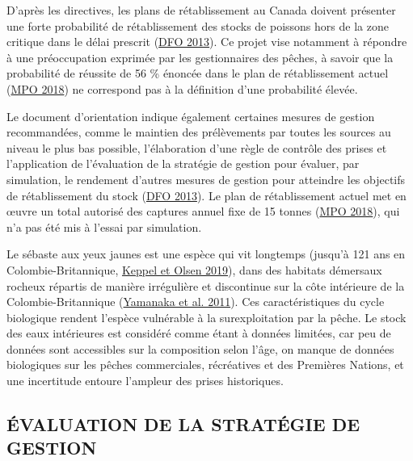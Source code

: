 \documentclass[french,11pt]{book}
\begin{document}
D'après les directives, les plans de rétablissement au Canada doivent présenter une forte probabilité de rétablissement des stocks de poissons hors de la zone critique dans le délai prescrit (\protect\hyperlink{ref-dfo2013}{DFO 2013}). Ce projet vise notamment à répondre à une préoccupation exprimée par les gestionnaires des pêches, à savoir que la probabilité de réussite de 56 \% énoncée dans le plan de rétablissement actuel (\protect\hyperlink{ref-ifmp2018}{MPO 2018}) ne correspond pas à la définition d'une probabilité élevée.

Le document d'orientation indique également certaines mesures de gestion recommandées, comme le maintien des prélèvements par toutes les sources au niveau le plus bas possible, l'élaboration d'une règle de contrôle des prises et l'application de l'évaluation de la stratégie de gestion pour évaluer, par simulation, le rendement d'autres mesures de gestion pour atteindre les objectifs de rétablissement du stock (\protect\hyperlink{ref-dfo2013}{DFO 2013}). Le plan de rétablissement actuel met en œuvre un total autorisé des captures annuel fixe de 15 tonnes (\protect\hyperlink{ref-ifmp2018}{MPO 2018}), qui n'a pas été mis à l'essai par simulation.

Le sébaste aux yeux jaunes est une espèce qui vit longtemps (jusqu'à 121 ans en Colombie-Britannique, \protect\hyperlink{ref-keppel2019}{Keppel et Olsen 2019}), dans des habitats démersaux rocheux répartis de manière irrégulière et discontinue sur la côte intérieure de la Colombie-Britannique (\protect\hyperlink{ref-yamanaka2011}{Yamanaka et al. 2011}). Ces caractéristiques du cycle biologique rendent l'espèce vulnérable à la surexploitation par la pêche. Le stock des eaux intérieures est considéré comme étant à données limitées, car peu de données sont accessibles sur la composition selon l'âge, on manque de données biologiques sur les pêches commerciales, récréatives et des Premières Nations, et une incertitude entoure l'ampleur des prises historiques.

\hypertarget{sec:introduction-mse}{%
\subsection{ÉVALUATION DE LA STRATÉGIE DE GESTION}\label{sec:introduction-mse}}
\end{document}

